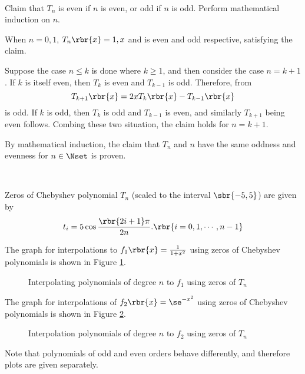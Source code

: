 \documentclass[english, nochinese]{../TeXTemplate/pkupaper}
\begin{document}
\begin{thmquestion}
\ 
\begin{thmanswer}
Claim that $T_n$ is even if $n$ is even, or odd if $n$ is odd. Perform mathematical induction on $n$.

When $ n = 0, 1 $, $ T_n \rbr{x} = 1, x $ and is even and odd respective, satisfying the claim.

Suppose the case $ n \le k $ is done where $ k \ge 1 $, and then consider the case $ n = k + 1 $. If $k$ is itself even, then $T_k$ is even and $ T_{ k - 1 } $ is odd. Therefore, from
\begin{equation}
T_{ k + 1 } \rbr{x} = 2 x T_k \rbr{x} - T_{ k - 1 } \rbr{x}
\end{equation}
is odd. If $k$ is odd, then $T_k$ is odd and $ T_{ k - 1 } $ is even, and similarly $ T_{ k + 1 } $ being even follows. Combing these two situation, the claim holds for $ n = k + 1 $.

By mathematical induction, the claim that $T_n$ and $n$ have the same oddness and evenness for $ n \in \Nset $ is proven.

\sqed
\end{thmanswer}
\end{thmquestion}

\begin{thmquestion}
\ 
\begin{thmanswer}
Zeros of Chebyshev polynomial $T_n$ (scaled to the interval $ \sbr{ -5, 5 } $) are given by
\begin{equation}
t_i = 5 \cos \frac{ \rbr{ 2 i + 1 } \pi }{ 2 n }. \rbr{ i = 0, 1, \cdots, n - 1 }
\end{equation}

The graph for interpolations to $ f_1 \rbr{x} = \frac{1}{ 1 + x^2 } $ using zeros of Chebyshev polynomials is shown in Figure \ref{Fig:CheTan}.
\begin{figure}[htbp]
\centering \scalebox{0.8}{}
\centering \scalebox{0.8}{}
\caption{Interpolating polynomials of degree $n$ to $f_1$ using zeros of $T_n$} \label{Fig:CheTan}
\end{figure}
The graph for interpolations of $ f_2 \rbr{x} = \se^{-x^2} $ using zeros of Chebyshev polynomials is shown in Figure \ref{Fig:CheExp}.
\begin{figure}[htbp]
\centering \scalebox{0.8}{}
\centering \scalebox{0.8}{}
\caption{Interpolation polynomials of degree $n$ to $f_2$ using zeros of $T_n$} \label{Fig:CheExp}
\end{figure}
Note that polynomials of odd and even orders behave differently, and therefore plots are given separately.
\end{thmanswer}
\end{thmquestion}
\end{document}
